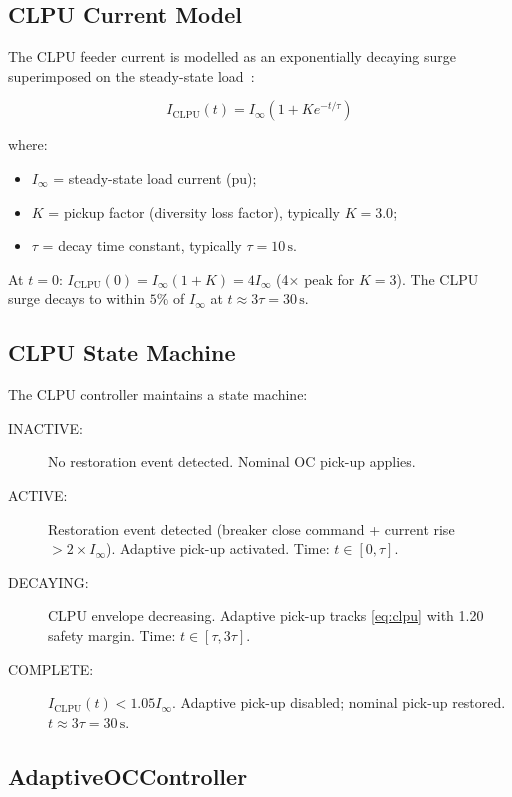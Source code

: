 \documentclass[11pt, a4paper]{article}
\begin{document}
\subsection{CLPU Current Model}

The CLPU feeder current is modelled as an exponentially decaying surge
superimposed on the steady-state load~\cite{McDonald1979}:

\begin{equation}
  I_{\mathrm{CLPU}}(t) = I_\infty \left(1 + K e^{-t/\tau}\right)
  \label{eq:clpu}
\end{equation}

\noindent where:
\begin{itemize}
  \item $I_\infty$ = steady-state load current (pu);
  \item $K$ = pickup factor (diversity loss factor), typically $K = 3.0$;
  \item $\tau$ = decay time constant, typically $\tau = 10\,\text{s}$.
\end{itemize}

At $t = 0$: $I_{\mathrm{CLPU}}(0) = I_\infty(1 + K) = 4 I_\infty$
(4$\times$ peak for $K = 3$).
The CLPU surge decays to within $5\%$ of $I_\infty$ at
$t \approx 3\tau = 30\,\text{s}$.

\subsection{CLPU State Machine}

The CLPU controller maintains a state machine:

\begin{description}
  \item[INACTIVE:] No restoration event detected. Nominal OC pick-up applies.
  \item[ACTIVE:] Restoration event detected (breaker close command + current
    rise $> 2\times I_\infty$). Adaptive pick-up activated. Time: $t \in [0, \tau]$.
  \item[DECAYING:] CLPU envelope decreasing. Adaptive pick-up tracks
    \eqref{eq:clpu} with 1.20 safety margin. Time: $t \in [\tau, 3\tau]$.
  \item[COMPLETE:] $I_{\mathrm{CLPU}}(t) < 1.05 I_\infty$. Adaptive pick-up
    disabled; nominal pick-up restored. $t \approx 3\tau = 30\,\text{s}$.
\end{description}

\subsection{AdaptiveOCController}
\end{document}

